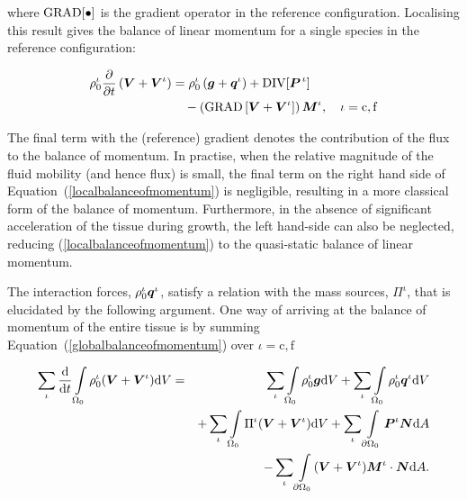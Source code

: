 \noindent where $\mathrm{\small{GRAD}[\bullet]}$ is the gradient
operator in the reference configuration. Localising this result gives
the balance of linear momentum for a single species in the reference
configuration:

\begin{equation}
\begin{split}
\rho_0^\iota\frac{\partial}{\partial t}\left(\mbox{\boldmath$ V$}+\mbox{\boldmath$ V$}^\iota\right) &
=\rho^\iota_0\left(\mbox{\boldmath$ g$}+\mbox{\boldmath$ q$}^\iota\right) +
\mathrm{\small{DIV}}[\mbox{\boldmath$ P$}^{\,\iota}]\\ 
& \quad -\left(\mathrm{\small{GRAD}}\left[\mbox{\boldmath$ V$}+
  \mbox{\boldmath$ V$}^\iota\right]\right)\mbox{\boldmath$ M$}^\iota, \quad \iota = \mathrm{c,f}
\label{localbalanceofmomentum}
\end{split}
\end{equation} 

The final term with the (reference) gradient denotes the contribution
of the flux to the balance of momentum. In practise, when the relative
magnitude of the fluid mobility (and hence flux) is small, the
final term on the right hand side of
Equation~(\ref{localbalanceofmomentum}) is negligible, resulting in a
more classical form of the balance of momentum. Furthermore, in the
absence of significant acceleration of the tissue during growth, the
left hand-side can also be neglected, reducing
(\ref{localbalanceofmomentum}) to the quasi-static balance of linear
momentum.

The interaction forces, $\rho_0^\iota\mbox{\boldmath$ q$}^\iota$, satisfy a
relation with the mass sources, $\Pi^\iota$, that is elucidated by
the following argument. One way of arriving at the  balance of
momentum of the entire tissue is by summing
Equation~(\ref{globalbalanceofmomentum}) over $\iota = \mathrm{c,f}$

\begin{eqnarray}
\sum\limits_{\iota}\frac{\mathrm{d}}{\mathrm{d}t}
\int\limits_{\Omega_0} \rho_0^\iota(\mbox{\boldmath$ V$}+\mbox{\boldmath$ V$}^\iota) \mathrm{d}V &=&
\sum\limits_{\iota}\int\limits_{\Omega_0} \rho^\iota_0\mbox{\boldmath$ g$}
\mathrm{d}V + \sum\limits_{\iota}\int\limits_{\Omega_0}
\rho^\iota_0\mbox{\boldmath$ q$}^\iota \mathrm{d}V\nonumber\\& & +
\sum\limits_{\iota}\int\limits_{\Omega_0} \Pi^\iota(\mbox{\boldmath$ V$}+\mbox{\boldmath$ V$}^\iota)
\mathrm{d}V + \sum\limits_{\iota} \int\limits_{\partial
\Omega_0}\mbox{\boldmath$ P$}^\iota\mbox{\boldmath$ N$} \mathrm{d}A\nonumber\\
& & - \sum\limits_{\iota}\int\limits_{\partial
\Omega_0}(\mbox{\boldmath$ V$}+\mbox{\boldmath$ V$}^\iota)\mbox{\boldmath$ M$}^\iota\cdot\mbox{\boldmath$ N$} \mathrm{d}A.
\label{momentumsummation}
\end{eqnarray}

